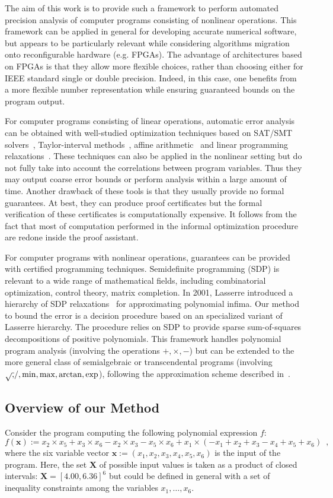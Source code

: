 \documentclass[a4paper,10pt]{article}
\newcommand{\x}{\mathbf{x}}
\def\X{\mathbf{X}}
\theoremstyle{plain}
\theoremstyle{definition}
\theoremstyle{remark}
\begin{document}
The aim of this work is to provide such a framework to perform automated precision analysis of computer programs consisting of nonlinear operations. 
This framework can be applied in general for developing accurate numerical software, but appears to be particularly relevant while considering algorithms migration onto reconfigurable hardware (e.g. FPGAs). The advantage of architectures based on FPGAs is that they allow more flexible choices, rather than choosing either for IEEE standard single or double precision. Indeed, in this case, one benefits from a more flexible number representation while ensuring guaranteed bounds on the program output. 

For computer programs consisting of linear operations, automatic error analysis can be obtained with well-studied optimization techniques based on SAT/SMT solvers~\cite{Darulova14Popl,hgbk2012fmcad}, Taylor-interval methods~\cite{fptaylor15}, affine arithmetic~\cite{fluctuat} and linear programming relaxations~\cite{Boland10HGR}.
These techniques can also be applied in the nonlinear setting but do not fully take into account the correlations between program variables. Thus they may output coarse error bounds or perform analysis within a large amount of time.  Another drawback of these tools is that they usually provide no formal guarantees. At best, they can produce proof certificates but the formal verification of these certificates is computationally expensive. It follows from the fact that most of computation performed in the informal optimization procedure are redone inside the proof assistant.

For computer programs with nonlinear operations, guarantees can be provided with certified programming techniques.
Semidefinite programming (SDP) is relevant to a wide range of mathematical fields, including combinatorial optimization, control theory, matrix completion. In 2001, Lasserre introduced a hierarchy of SDP relaxations~\cite{Lasserre01moments} for approximating polynomial infima. Our method to bound the error is a decision procedure based on an specialized variant of Lasserre hierarchy. The procedure relies on SDP to provide sparse sum-of-squares decompositions of positive polynomials. This framework handles polynomial program analysis (involving the operations $+,\times,-$) but can be extended to the more general class of semialgebraic or transcendental programs (involving $\sqrtsign, /, \min, \max, \arctan, \exp$), following the approximation scheme described in~\cite{Magron15sdp}.

\subsection{Overview of our Method}
%
Consider the program computing the following polynomial expression $f$:
\[ f(\x) := x_2 \times x_5 + x_3 \times x_6 - x_2 \times x_3  - x_5 \times x_6 + x_1 \times ( - x_1 +  x_2 +  x_3  - x_4 +  x_5 +  x_6) \enspace, \]
where the six variable vector $\x :=  (x_1, x_2, x_3, x_4, x_5, x_6)$ is the input of the program. Here, the set $\X$ of possible input values is taken as a product of closed intervals: $\X = [4.00, 6.36]^6$ but could be defined in general with a set of inequality constraints among the variables $x_1, \dots, x_6$. 
\end{document}
